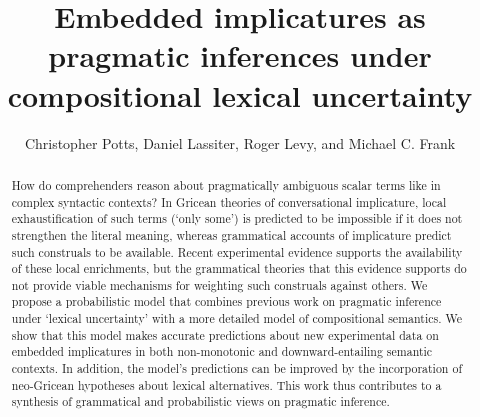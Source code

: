 \documentclass[leqno,12pt]{article}
\begin{document}

\title{Embedded implicatures as pragmatic inferences under compositional lexical uncertainty}
\author{Christopher Potts, Daniel Lassiter, Roger Levy, and Michael
  C. Frank}
\maketitle

\begin{abstract} 
  How do comprehenders reason about pragmatically ambiguous scalar
  terms like  in complex syntactic contexts?  In Gricean
  theories of conversational implicature, local exhaustification of
  such terms (`only some') is predicted to be impossible if it does
  not strengthen the literal meaning, whereas grammatical accounts of
  implicature predict such construals to be available. Recent
  experimental evidence supports the availability of these local
  enrichments, but the grammatical theories that this evidence
  supports do not provide viable mechanisms for weighting such
  construals against others. We propose a probabilistic model that
  combines previous work on pragmatic inference under `lexical
  uncertainty' with a more detailed model of compositional
  semantics. We show that this model makes accurate predictions about
  new experimental data on embedded implicatures in both non-monotonic
  and downward-entailing semantic contexts. In addition, the model's
  predictions can be improved by the incorporation of neo-Gricean
  hypotheses about lexical alternatives. This work thus contributes to
  a synthesis of grammatical and probabilistic views on pragmatic
  inference.
\end{abstract}

\end{document}
